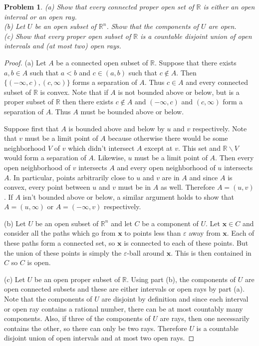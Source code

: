 \documentclass{article}
\newtheorem{problem}{Problem}
\begin{document}
\begin{problem}
(a) Show that every connected proper open set of $\mathbb{R}$ is either an open interval or an open ray.\\
(b) Let $U$ be an open subset of $\mathbb{R}^n$. Show that the components of $U$ are open.\\
(c) Show that every proper open subset of $\mathbb{R}$ is a countable disjoint union of open intervals and (at most two) open rays.
\end{problem}
\begin{proof}
(a) Let $A$ be a connected open subset of $\mathbb{R}$. Suppose that there exists $a,b \in A$ such that $a < b$ and $c \in (a,b)$ such that $c \notin A$. Then $\{(-\infty, c), (c, \infty)\}$ forms a separation of $A$. Thus $c \in A$ and every connected subset of $\mathbb{R}$ is convex. Note that if $A$ is not bounded above or below, but is a proper subset of $\mathbb{R}$ then there exists $c \notin A$ and $(-\infty, c)$ and $(c, \infty)$ form a separation of $A$. Thus $A$ must be bounded above or below.

Suppose first that $A$ is bounded above and below by $u$ and $v$ respectively. Note that $v$ must be a limit point of $A$ because otherwise there would be some neighborhood $V$ of $v$ which didn't intersect $A$ except at $v$. This set and $\mathbb{R} \backslash V$ would form a separation of $A$. Likewise, $u$ must be a limit point of $A$. Then every open neighborhood of $v$ intersects $A$ and every open neighborhood of $u$ intersects $A$. In particular, points arbitrarily close to $u$ and $v$ are in $A$ and since $A$ is convex, every point between $u$ and $v$ must be in $A$ as well. Therefore $A = (u,v)$. If $A$ isn't bounded above or below, a similar argument holds to show that $A = (u, \infty)$ or $A = (-\infty, v)$ respectively.

(b) Let $U$ be an open subset of $\mathbb{R}^n$ and let $C$ be a component of $U$. Let $\mathbf{x} \in C$ and consider all the paths which go from $\mathbf{x}$ to points less than $\varepsilon$ away from $\mathbf{x}$. Each of these paths form a connected set, so $\mathbf{x}$ is connected to each of these points. But the union of these points is simply the $\varepsilon$-ball around $\mathbf{x}$. This is then contained in $C$ so $C$ is open.

(c) Let $U$ be an open proper subset of $\mathbb{R}$. Using part (b), the components of $U$ are open connected subsets and these are either intervals or open rays by part (a). Note that the components of $U$ are disjoint by definition and since each interval or open ray contains a rational number, there can be at most countably many components. Also, if three of the components of $U$ are rays, then one necessarily contains the other, so there can only be two rays. Therefore $U$ is a countable disjoint union of open intervals and at most two open rays.
\end{proof}
\end{document}
